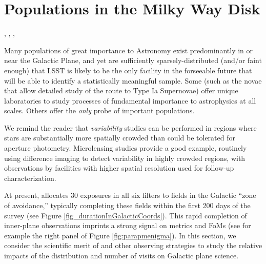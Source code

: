 %
%
%

\section{Populations in the Milky Way Disk}
\def\secname{MW_Disk}\label{sec:\secname}

, , , 

Many populations of great importance to Astronomy exist predominantly
in or near the Galactic Plane, and yet are sufficiently
sparsely-distributed (and/or faint enough) that LSST is likely to be
the only facility in the forseeable future that will be able to
identify a statistically meaningful sample. Some (such as the novae
that allow detailed study of the route to Type Ia Supernovae) offer
unique laboratories to study processes of fundamental importance to
astrophysics at all scales. Others \citep[like slow-microlensing events
  heralding an unseen compact object population; e.g.][]{2016MNRAS.458.3012W} offer the {\it only}
probe of important populations.

We remind the reader that {\it variability} studies can be performed
in regions where stars are substantially more spatially crowded than could be
tolerated for aperture photometry. Microlensing studies provide a good
example, routinely using difference imaging \citep[e.g.][]{1998ApJ...503..325A, 2010MNRAS.409..247K} to detect variability in highly crowded regions, with observations by
facilities with higher spatial resolution used for follow-up
characterization.


At present,  allocates 30
exposures in all six filters to fields in the Galactic ``zone of
avoidance,'' typically completing these fields within the first 200
days of the survey (see Figure
\ref{fig_durationInGalacticCoords}). This rapid completion of inner-plane observations imprints a strong signal on
metrics and FoMs (see for example the right panel of Figure
\ref{fig:parapmenigma}).  In this section, we consider the scientific merit of  and other observing strategies to study the relative impacts of the distribution and number of visits on Galactic plane science. 

